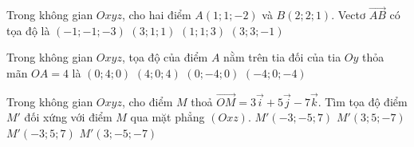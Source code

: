 \begin{ex}
	Trong không gian $Oxyz$, cho hai điểm $A(1; 1; -2)$ và $B(2; 2; 1)$. Vectơ $\overrightarrow{AB}$ có tọa độ là
	\choice
	{$(-1; -1; -3)$}
	{$(3; 1; 1)$}
	{\True $(1; 1; 3)$}
	{$(3; 3; -1)$}
\end{ex}

\begin{ex}
	Trong không gian $Oxyz$, tọa độ của điểm $A$ nằm trên tia đối của tia $Oy$ thỏa mãn $OA = 4$ là
	\choice
	{$(0; 4; 0)$}
	{$(4; 0; 4)$}
	{\True $(0; -4; 0)$}
	{$(-4; 0; -4)$}
\end{ex}

\begin{ex}
	Trong không gian $Oxyz$, cho điểm $M$ thoả $\overrightarrow{OM} = 3\overrightarrow{i} + 5\overrightarrow{j} - 7\overrightarrow{k}$. Tìm tọa độ điểm $M'$ đối xứng với điểm $M$ qua mặt phẳng $(Oxz)$.
	\choice
	{$M'(-3; -5; 7)$}
	{$M'(3; 5; -7)$}
	{$M'(-3; 5; 7)$}
	{\True $M'(3; -5; -7)$}
\end{ex}
